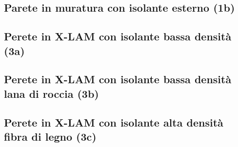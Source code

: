 \documentclass[a4paper,10pt]{report}
\begin{document}
\begin{landscape}
        \subsection*{Parete in muratura con isolante esterno (1b)}
                \begin{minipage}[c]{0.3\linewidth}
                        
                \end{minipage}
                \hspace*{0.15\linewidth}
                \begin{minipage}[c]{0.55\linewidth}
                            
                \end{minipage}
        \subsection*{Perete in X-LAM con isolante bassa densità (3a)}
                \begin{minipage}[c]{0.3\linewidth}
                        
                \end{minipage}
                \hspace*{0.15\linewidth}
                \begin{minipage}[c]{0.55\linewidth}
                            
                \end{minipage}
        \subsection*{Perete in X-LAM con isolante bassa densità lana di roccia (3b)}
                \begin{minipage}[c]{0.3\linewidth}
                        
                \end{minipage}
                \hspace*{0.15\linewidth}
                \begin{minipage}[c]{0.55\linewidth}
                            
                \end{minipage}
        \subsection*{Perete in X-LAM con isolante alta densità fibra di legno (3c)}
                \begin{minipage}[c]{0.3\linewidth}
                        
                \end{minipage}
                \hspace*{0.15\linewidth}
                \begin{minipage}[c]{0.55\linewidth}
                            
                \end{minipage}
                \clearpage       
\end{landscape}
\end{document}
